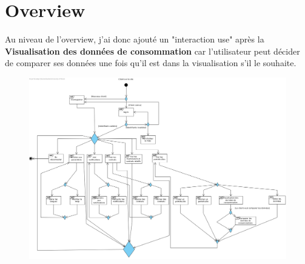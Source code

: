 \section{Overview}

\begin{flushleft}
Au niveau de l'overview, j'ai donc ajouté un "interaction use" après la \textbf{Visualisation des données de consommation} car l'utilisateur peut décider de comparer ses données une fois qu'il est dans la visualisation s'il le souhaite.
\end{flushleft}

\begin{figure}[h]
\centering
\includegraphics[width=1.3\textwidth]{extension-adrien/Overview/img/overview.png}
\end{figure}

